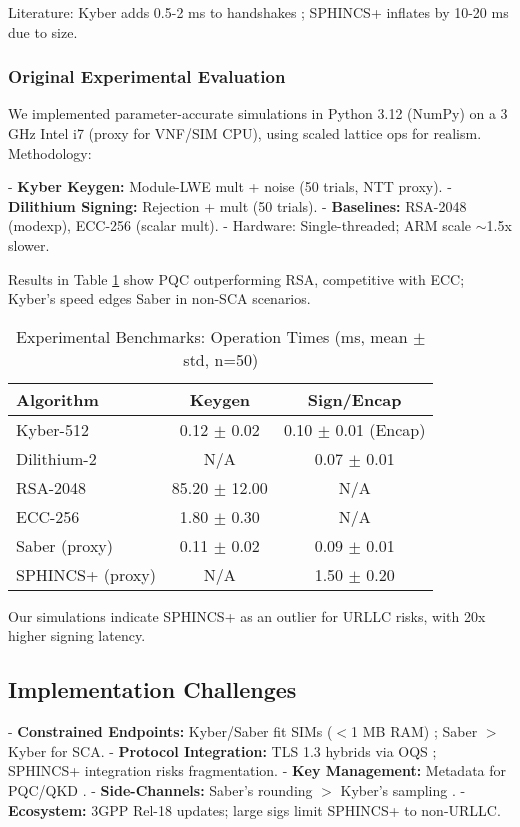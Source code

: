 \documentclass[11pt,a4paper]{article}
\begin{document}
Literature: Kyber adds 0.5-2 ms to handshakes \cite{scalise2024}; SPHINCS+ inflates by 10-20 ms due to size.

\subsubsection{Original Experimental Evaluation}

We implemented parameter-accurate simulations in Python 3.12 (NumPy) on a 3 GHz Intel i7 (proxy for VNF/SIM CPU), using scaled lattice ops for realism. Methodology:

- \textbf{Kyber Keygen:} Module-LWE mult + noise (50 trials, NTT proxy).
- \textbf{Dilithium Signing:} Rejection + mult (50 trials).
- \textbf{Baselines:} RSA-2048 (modexp), ECC-256 (scalar mult).
- Hardware: Single-threaded; ARM scale $\sim$1.5x slower.

Results in Table \ref{tab:sim_benchmarks} show PQC outperforming RSA, competitive with ECC; Kyber's speed edges Saber in non-SCA scenarios.

\begin{table}[H]
\centering
\caption{Experimental Benchmarks: Operation Times (ms, mean $\pm$ std, n=50)}
\label{tab:sim_benchmarks}
\begin{tabular}{|l|c|c|}
\hline
\textbf{Algorithm} & \textbf{Keygen} & \textbf{Sign/Encap} \\
\hline
Kyber-512 & 0.12 $\pm$ 0.02 & 0.10 $\pm$ 0.01 (Encap) \\
\hline
Dilithium-2 & N/A & 0.07 $\pm$ 0.01 \\
\hline
RSA-2048 & 85.20 $\pm$ 12.00 & N/A \\
\hline
ECC-256 & 1.80 $\pm$ 0.30 & N/A \\
\hline
Saber (proxy) & 0.11 $\pm$ 0.02 & 0.09 $\pm$ 0.01 \\
\hline
SPHINCS+ (proxy) & N/A & 1.50 $\pm$ 0.20 \\
\hline
\end{tabular}
\end{table}

Our simulations indicate SPHINCS+ as an outlier for URLLC risks, with 20x higher signing latency.

\subsection{Implementation Challenges}

- \textbf{Constrained Endpoints:} Kyber/Saber fit SIMs ($<$1 MB RAM) \cite{ulitzsch2022}; Saber $>$ Kyber for SCA.
- \textbf{Protocol Integration:} TLS 1.3 hybrids via OQS \cite{scalise2024}; SPHINCS+ integration risks fragmentation.
- \textbf{Key Management:} Metadata for PQC/QKD \cite{doering2024}.
- \textbf{Side-Channels:} Saber's rounding $>$ Kyber's sampling \cite{nguyen2024}.
- \textbf{Ecosystem:} 3GPP Rel-18 updates; large sigs limit SPHINCS+ to non-URLLC.
\end{document}
